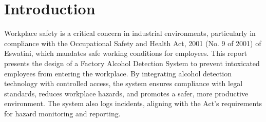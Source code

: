 \section{Introduction}
\label{chap:introduction}
Workplace safety is a critical concern in industrial environments, particularly in compliance with the Occupational Safety and Health Act, 2001 (No. 9 of 2001) of Eswatini, which mandates safe working conditions for employees. This report presents the design of a Factory Alcohol Detection System to prevent intoxicated employees from entering the workplace. By integrating alcohol detection technology with controlled access, the system ensures compliance with legal standards, reduces workplace hazards, and promotes a safer, more productive environment. The system also logs incidents, aligning with the Act's requirements for hazard monitoring and reporting.
